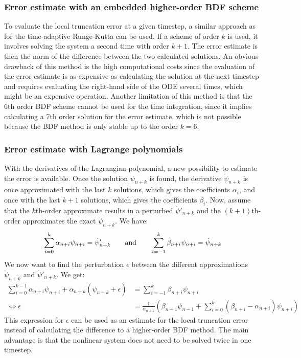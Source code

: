 \subsubsection{Error estimate with an embedded higher-order BDF scheme}
\label{sssec:errorEstimateBDFEmbeddedScheme}
To evaluate the local truncation error at a given timestep, a similar approach as for the time-adaptive Runge-Kutta can be used. If a scheme of order $k$ is used, it involves solving the system a second time with order $k+1$. The error estimate is then the norm of the difference between the two calculated solutions. An obvious drawback of this method is the high computational costs since the evaluation of the error estimate is as expensive as calculating the solution at the next timestep and requires evaluating the right-hand side of the ODE several times, which might be an expensive operation. Another limitation of this method is that the 6th order BDF scheme cannot be used for the time integration, since it implies calculating a 7th order solution for the error estimate, which is not possible because the BDF method is only stable up to the order $k=6$. 

\subsubsection{Error estimate with Lagrange polynomials}
\label{sssec:errorEstimateBDFLagrange}
With the derivatives of the Lagrangian polynomial, a new possibility to estimate the error is available. Once the solution $\psi_{n+k}$ is found, the derivative $\dot{\psi}_{n+k}$ is once approximated with the last $k$ solutions, which gives the coefficients $\alpha_i$, and once with the last $k+1$ solutions, which gives the coefficients $\beta_i$. Now, assume that the $k$th-order approximate results in a perturbed $\dot{\psi}'_{n+k}$ and the $(k+1)$th-order approximates the exact $\dot{\psi}_{n+k}$. We have:
\begin{equation}
	\sum_{i=0}^{k}\alpha_{n+i}\psi_{n+i} = \dot{\psi}'_{n+k} \qquad \text{and}\qquad \sum_{i=-1}^{k}\beta_{n+i}\psi_{n+i} = \dot{\psi}_{n+k} \\
\end{equation}
We now want to find the perturbation $\epsilon$ between the different approximations $\dot{\psi}_{n+k}$ and $\dot{\psi}'_{n+k}$. We get:
\begin{align}
	\sum_{i=0}^{k-1}\alpha_{n+i}\psi_{n+i} + \alpha_{n+k}(\psi_{n+k} + \epsilon) &= \sum_{i=-1}^{k}\beta_{n+i}\psi_{n+i} \nonumber \\ 
	\Leftrightarrow
	\epsilon &= \frac{1}{\alpha_{n+k}}\left(\beta_{n-1}\psi_{n-1} + \sum_{i=0}^{k}(\beta_{n+i}-\alpha_{n+i})\psi_{n+i}\right)
\end{align}
This expression for $\epsilon$ can be used as an estimate for the local truncation error instead of calculating the difference to a higher-order BDF method. The main advantage is that the nonlinear system does not need to be solved twice in one timestep.

